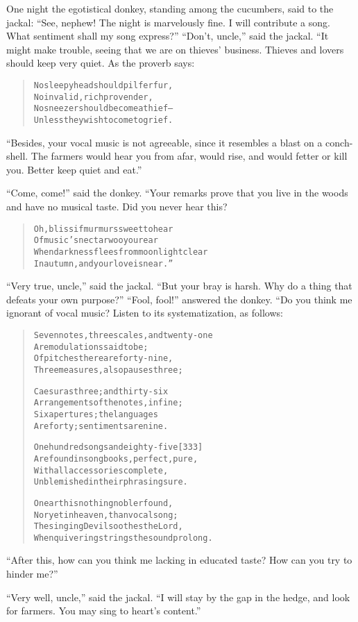 \documentclass[article, twoside, 14pt]{memoir}
\renewenvironment{verbatim}{%
\begin{quote}%
\vskip -10pt%
\begin{alltt}\normalfont\large}{\end{alltt}%
\end{quote}%
\vskip -10pt
} %
\begin{document}
One night the egotistical donkey, standing among the cucumbers,
said to the jackal:
``See, nephew! The night is marvelously fine. I will contribute a song. What sentiment shall my song express?''
``Don't, uncle,'' said the jackal. “It might make trouble, seeing
that we are on thieves' business. Thieves and lovers should keep
very quiet. As the proverb says:

\begin{verbatim}
No sleepyhead should pilfer fur,
No invalid, rich provender,
No sneezer should become a thief--
Unless they wish to come to grief.
\end{verbatim}
``Besides, your vocal music is not agreeable, since it resembles a blast on a conch-shell. The farmers would hear you from afar, would rise, and would fetter or kill you. Better keep quiet and eat.''

``Come, come!'' said the donkey. “Your remarks prove that you live
in the woods and have no musical taste. Did you never hear this?

\begin{verbatim}
Oh, bliss if murmurs sweet to hear
Of music's nectar woo your ear
When darkness flees from moonlight clear
In autumn, and your love is near.”
\end{verbatim}
``Very true, uncle,'' said the jackal.
``But your bray is harsh. Why do a thing that defeats your own purpose?''
``Fool, fool!'' answered the donkey. “Do you think me ignorant of
vocal music? Listen to its systematization, as follows:

\begin{verbatim}
Seven notes, three scales, and twenty-one
    Are modulations said to be;
Of pitches there are forty-nine,
    Three measures, also pauses three;

Caesuras three; and thirty-six
    Arrangements of the notes, in fine;
Six apertures; the languages
    Are forty; sentiments are nine.

One hundred songs and eighty-five                       [333]
    Are found in songbooks, perfect, pure,
With all accessories complete,
    Unblemished in their phrasing sure.

On earth is nothing nobler found,
    Nor yet in heaven, than vocal song;
The singing Devil soothes the Lord,
    When quivering strings the sound prolong.
\end{verbatim}
``After this, how can you think me lacking in educated taste? How can you try to hinder me?''

``Very well, uncle,'' said the jackal.
``I will stay by the gap in the hedge, and look for farmers. You may sing to heart's content.''
\end{document}
